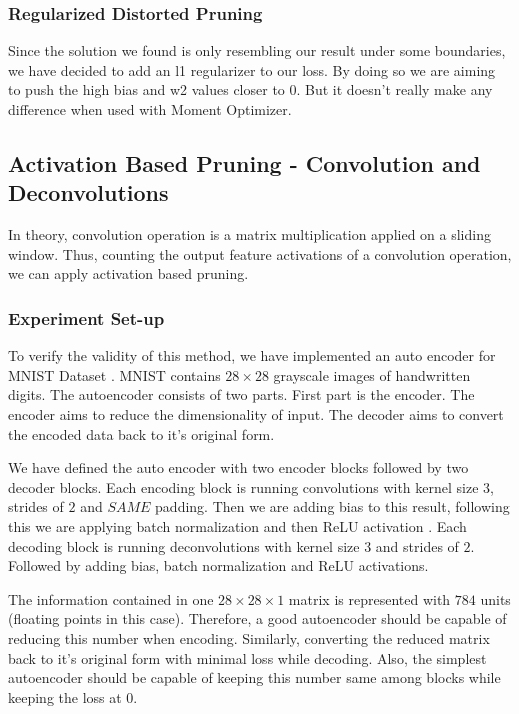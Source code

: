 \subsubsection{Regularized Distorted Pruning}
Since the solution we found is only resembling our result under some boundaries, we have decided to add an l1 regularizer to our loss. By doing so we are aiming to push the high bias and w2 values closer to 0. But it doesn't really make any difference when used with Moment Optimizer.


\subsection{Activation Based Pruning - Convolution and Deconvolutions}
In theory, convolution operation is a matrix multiplication applied on a sliding window. Thus, counting the output feature activations of a convolution operation, we can apply activation based pruning. 

\subsubsection{Experiment Set-up}
To verify the validity of this method, we have implemented an auto encoder for MNIST Dataset \cite{lecun1998mnist}. MNIST contains $28 \times 28$ grayscale images of handwritten digits. The autoencoder consists of two parts. First part is the encoder. The encoder aims to reduce the dimensionality of input. The decoder aims to convert the encoded data back to it's original form.

We have defined the auto encoder with two encoder blocks followed by two decoder blocks. Each encoding block is running convolutions with kernel size $3$, strides of $2$ and $SAME$ padding. Then we are adding bias to this result, following this we are applying batch normalization \cite{ioffe2015batch} and then ReLU activation \cite{nair2010rectified}. Each decoding block is running deconvolutions with kernel size $3$ and strides of $2$. Followed by adding bias, batch normalization and ReLU activations. 

The information contained in one $28 \times 28 \times 1$ matrix is represented with $784$ units (floating points in this case). Therefore, a good autoencoder should be capable of reducing this number when encoding. Similarly, converting the reduced matrix back to it's original form with minimal loss while decoding. Also, the simplest autoencoder should be capable of keeping this number same among blocks while keeping the loss at 0. 

